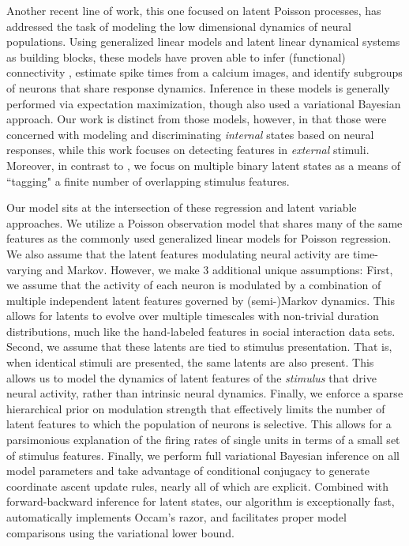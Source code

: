\documentclass[12pt,a4paper]{article}
\begin{document}
Another recent line of work, this one focused on latent Poisson processes, has addressed the task of modeling the low dimensional dynamics of neural populations\cite{Pillow2008-em,Vogelstein2009-ax,Park2014-el,Buesing2014-ta,Archer2015-ec, Zhao2016-bw,Gao2016-ck}. Using generalized linear models and latent linear dynamical systems as building blocks, these models have proven able to infer (functional) connectivity \cite{Pillow2008-em}, estimate spike times from a calcium images\cite{Vogelstein2009-ax}, and identify subgroups of neurons that share response dynamics\cite{Buesing2014-ta,Zhao2016-bw,Gao2016-ck}. Inference in these models is generally performed via expectation maximization, though \cite{Ulrich2014-zc,Putzky2014-up,Archer2015-ec, Zhao2016-bw,Gao2016-ck} also used a variational Bayesian approach. Our work is distinct from those models, however, in that those were concerned with modeling and discriminating \emph{internal} states based on neural responses, while this work focuses on detecting features in \emph{external} stimuli. Moreover, in contrast to \cite{Buesing2014-ta,Archer2015-ec,Zhao2016-bw,Gao2016-ck}, we focus on multiple binary latent states as a means of ``tagging" a finite number of overlapping stimulus features.

Our model sits at the intersection of these regression and latent variable approaches. We utilize a Poisson observation model that shares many of the same features as the commonly used generalized linear models for Poisson regression. We also assume that the latent features modulating neural activity are time-varying and Markov. However, we make 3 additional unique assumptions: First, we assume that the activity of each neuron is modulated by a combination of multiple independent latent features governed by (semi-)Markov dynamics. This allows for latents to evolve over multiple timescales with non-trivial duration distributions, much like the hand-labeled features in social interaction data sets. Second, we assume that these latents are tied to stimulus presentation. That is, when identical stimuli are presented, the same latents are also present. This allows us to model the dynamics of latent features of the \emph{stimulus} that drive neural activity, rather than intrinsic neural dynamics. Finally, we enforce a sparse hierarchical prior on modulation strength that effectively limits the number of latent features to which the population of neurons is selective. This allows for a parsimonious explanation of the firing rates of single units in terms of a small set of stimulus features. Finally, we perform full variational Bayesian inference on all model parameters and take advantage of conditional conjugacy to generate coordinate ascent update rules, nearly all of which are explicit. Combined with forward-backward inference for latent states, our algorithm is exceptionally fast, automatically implements Occam's razor, and facilitates proper model comparisons using the variational lower bound.
\end{document}
